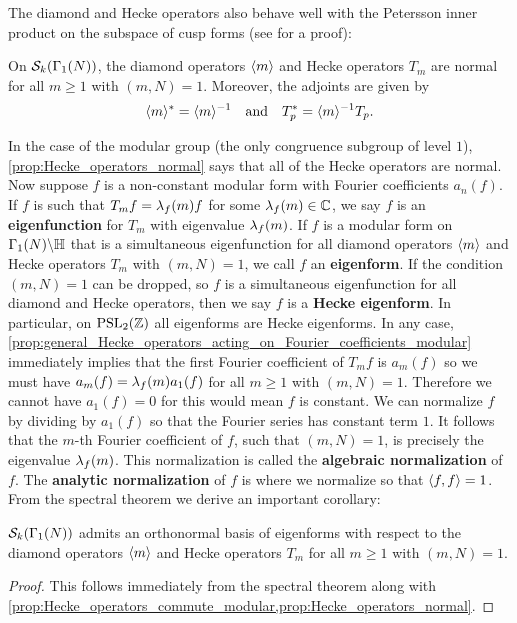       The diamond and Hecke operators also behave well with the Petersson inner product on the subspace of cusp forms (see \cite{lang1987introduction} for a proof):

      \begin{proposition}\label{prop:Hecke_operators_normal}
        On $\mathcal{S}_{k}(\Gamma_{1}(N))$, the diamond operators $\langle m\rangle$ and Hecke operators $T_{m}$ are normal for all $m \ge 1$ with $(m,N) = 1$. Moreover, the adjoints are given by
        \[
          \langle m\rangle^{\ast} = \langle m\rangle^{-1} \quad \text{and} \quad T_{p}^{\ast} = \langle m\rangle^{-1}T_{p}.
        \]
      \end{proposition}

      In the case of the modular group (the only congruence subgroup of level $1$), \cref{prop:Hecke_operators_normal} says that all of the Hecke operators are normal. Now suppose $f$ is a non-constant modular form with Fourier coefficients $a_{n}(f)$. If $f$ is such that $T_{m}f = \lambda_{f}(m)f$ for some $\lambda_{f}(m) \in \mathbb{C}$, we say $f$ is an \textbf{eigenfunction} for $T_{m}$ with eigenvalue $\lambda_{f}(m)$. If $f$ is a modular form on $\Gamma_{1}(N)\backslash\mathbb{H}$ that is a simultaneous eigenfunction for all diamond operators $\langle m\rangle$ and Hecke operators $T_{m}$ with $(m,N) = 1$, we call $f$ an \textbf{eigenform}. If the condition $(m,N) = 1$ can be dropped, so $f$ is a simultaneous eigenfunction for all diamond and Hecke operators, then we say $f$ is a \textbf{Hecke eigenform}. In particular, on $\mathrm{PSL}_{2}(\mathbb{Z})$ all eigenforms are Hecke eigenforms. In any case, \cref{prop:general_Hecke_operators_acting_on_Fourier_coefficients_modular} immediately implies that the first Fourier coefficient of $T_{m}f$ is $a_{m}(f)$ so we must have $a_{m}(f) = \lambda_{f}(m)a_{1}(f)$ for all $m \ge 1$ with $(m,N) = 1$. Therefore we cannot have $a_{1}(f) = 0$ for this would mean $f$ is constant. We can normalize $f$ by dividing by $a_{1}(f)$ so that the Fourier series has constant term $1$. It follows that the $m$-th Fourier coefficient of $f$, such that $(m,N) = 1$, is precisely the eigenvalue $\lambda_{f}(m)$. This normalization is called the \textbf{algebraic normalization} of $f$. The \textbf{analytic normalization} of $f$ is where we normalize so that $\langle f,f\rangle = 1$. From the spectral theorem we derive an important corollary:

      \begin{theorem}\label{thm:eigenforms_forms_spectral_theory}
        $\mathcal{S}_{k}(\Gamma_{1}(N))$ admits an orthonormal basis of eigenforms with respect to the diamond operators $\langle m\rangle$ and Hecke operators $T_{m}$ for all $m \ge 1$ with $(m,N) = 1$.
      \end{theorem}
      \begin{proof}
        This follows immediately from the spectral theorem along with \cref{prop:Hecke_operators_commute_modular,prop:Hecke_operators_normal}.
      \end{proof}

